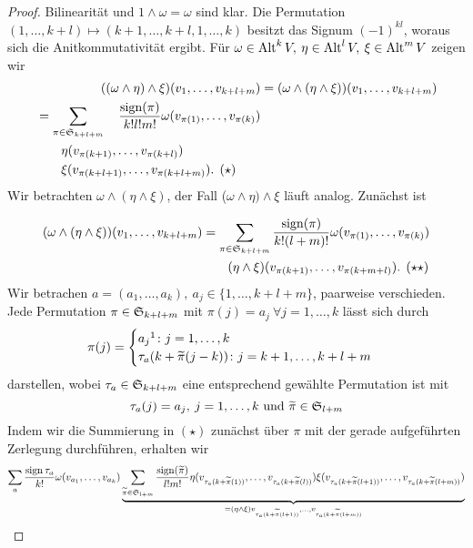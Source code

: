 \documentclass[skript.tex]{subfiles}
\begin{document}
	\begin{proof}
		Bilinearität und $1 \wedge \omega = \omega$ sind klar. Die Permutation $(1, \dots, k+l) \mapsto (k+1, \dots, k+l, 1, \dots, k)$ besitzt das Signum $(-1)^{kl}$, woraus sich die Anitkommutativität ergibt. Für $\omega \in \operatorname{Alt}^kV, \: \eta \in \operatorname{Alt}^l V, \: \xi \in \operatorname{Alt}^m V$ zeigen wir
		\begin{align*}
			((\omega \wedge \eta) \wedge \xi)(v_1, \dots, v_{k+l+m}) &= (\omega \wedge(\eta \wedge \xi))(v_1, \dots, v_{k+l+m}) \\
			\begin{split}
				{}&= \sum_{\pi \in \mathfrak{S}_{k+l+m}} \quad \frac{\operatorname{sign} (\pi)}{k!l!m!} \omega(v_{\pi(1)}, \dots, v_{\pi(k)})\\
				{}& \qquad \eta(v_{\pi(k+1)}, \dots, v_{\pi(k+l)}) \\
				{}& \qquad \xi(v_{\pi(k+l+1)}, \dots, v_{\pi(k+l+m)}). \: \: (\star)
			\end{split}
		\end{align*}
		Wir betrachten $\omega \wedge(\eta \wedge \xi)$, der Fall ($\omega \wedge \eta) \wedge \xi$ läuft analog. Zunächst ist
		
		\begin{align*}
		\begin{split}
			(\omega \wedge (\eta \wedge\xi))(v_1, \dots, v_{k+l+m}) &= \sum_{\pi \in \mathfrak{S}_{k+l+m}} \frac{\operatorname{sign}(\pi)}{k!(l+m)!} \omega(v_{\pi(1)}, \dots, v_{\pi(k)})\\ {}& \qquad (\eta \wedge \xi)(v_{\pi(k+1)}, \dots, v_{\pi(k+m+l)}). \: \: (\star \star)
		\end{split}
		\end{align*}
		Wir betrachen $a = (a_1, \dots, a_k), \: a_j \in \{1, \dots, k+l+m\}$, paarweise verschieden. \\ Jede Permutation $\pi \in \mathfrak{S}_{k+l+m}$ mit $\pi(j) = a_j \: \forall j=1, \dots, k$ lässt sich durch 
		\begin{equation*}
		\pi(j) = \begin{cases}
		a_j \footnotemark \colon j= 1, \dots, k \\ \tau_a(k+ \wt{\pi}(j-k)) \colon j = k+1, \dots, k+l+m
		\end{cases}
		\end{equation*}
		darstellen, wobei $\tau_a \in \mathfrak{S}_{k+l+m}$ eine entsprechend gewählte Permutation ist mit
		\begin{equation*}
		 \tau_a(j) = a_j, \: j=1, \dots, k$ und $\wt{\pi} \in \mf{S}_{l+m}
		\end{equation*}
		Indem wir die Summierung in $(\star)$ zunächst über $\pi$ mit der gerade aufgeführten Zerlegung durchführen, erhalten wir
		\begin{equation*}
		\sum_a \frac{\operatorname{sign} \tau_a}{k!} \omega(v_{a_1}, \dots, v_{a_k})
		\underbrace{\sum_{\widetilde{\pi} \in \mathfrak{S}_{l+m}} \frac{\operatorname{sign}(\widetilde{\pi})}{l!m!}\eta(v_{\tau_a(k+\widetilde{\pi}(1))}, \dots, v_{\tau_a(k+\widetilde{\pi}(l))}) \xi(v_{\tau_a(k+\widetilde{\pi}(l+1))}, \dots, v_{\tau_a(k+\widetilde{\pi}(l+m))})}_
			{=(\eta \wedge \xi)v_{\tau_a(k+\widetilde{\pi}(l+1))}, \dots, v_{\tau_a(k+\widetilde{\pi}(l+m))}}
		\end{equation*}
		

\end{proof}
\end{document}
